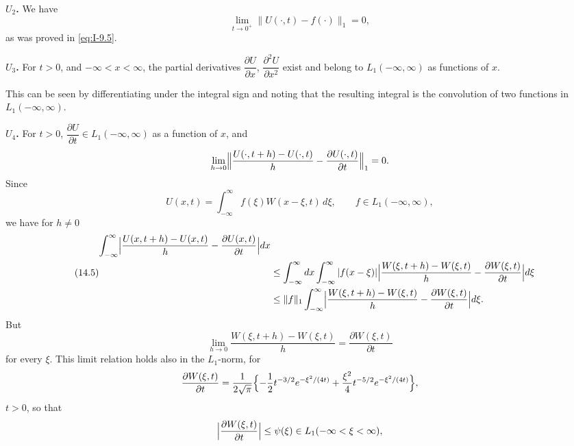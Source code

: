 \noindent\textbf{$U_2$.} We have
\begin{equation*}
\lim_{t\to 0^+}\|U(\cdot,t)-f(\cdot)\|_1=0,
\end{equation*}
as was proved in \eqref{eq:I-9.5}.

\noindent\textbf{$U_3$.} For $t>0$, and $-\infty<x<\infty$, the partial derivatives $\dfrac{\partial U}{\partial x}$, $\dfrac{\partial^{2}U}{\partial x^{2}}$ exist and belong to $L_1(-\infty,\infty)$ as functions of $x$.

This can be seen by differentiating under the integral sign and noting that the resulting integral is the convolution of two functions in $L_1(-\infty,\infty)$.

\noindent\textbf{$U_4$.} For $t>0$, $\dfrac{\partial U}{\partial t}\in L_1(-\infty,\infty)$ as a function of $x$, and
\begin{equation*}
\lim_{h\to 0}\Bigl\|\frac{U(\cdot,t+h)-U(\cdot,t)}{h}-\frac{\partial U(\cdot,t)}{\partial t}\Bigr\|_1=0.
\end{equation*}
Since
\begin{equation*}
U(x,t)=\int_{-\infty}^{\infty}f(\xi)W(x-\xi,t)\,d\xi,\qquad f\in L_1(-\infty,\infty),
\end{equation*}
we have for $h\neq 0$
\begin{equation}\label{eq:I-14.5}\tag{14.5}
\begin{aligned}
\int_{-\infty}^{\infty}\Bigl|\frac{U(x,t+h)-U(x,t)}{h}-\frac{\partial U(x,t)}{\partial t}\Bigr|dx\\
&\le\int_{-\infty}^{\infty}dx\int_{-\infty}^{\infty}|f(x-\xi)|\Bigl|\frac{W(\xi,t+h)-W(\xi,t)}{h}-\frac{\partial W(\xi,t)}{\partial t}\Bigr|d\xi\\
&\le\|f\|_1\int_{-\infty}^{\infty}\Bigl|\frac{W(\xi,t+h)-W(\xi,t)}{h}-\frac{\partial W(\xi,t)}{\partial t}\Bigr|d\xi.
\end{aligned}
\end{equation}
But
\begin{equation*}
\lim_{h\to 0}\frac{W(\xi,t+h)-W(\xi,t)}{h}=\frac{\partial W(\xi,t)}{\partial t}
\end{equation*}
for every $\xi$. This limit relation holds also in the $L_1$-norm, for
\begin{equation*}
\frac{\partial W(\xi,t)}{\partial t}
=\frac{1}{2\sqrt{\pi}}\Bigl\{-\frac12t^{-3/2}e^{-\xi^{2}/(4t)}+\frac{\xi^{2}}{4}t^{-5/2}e^{-\xi^{2}/(4t)}\Bigr\},
\end{equation*}
$t>0$, so that
\begin{equation*}
\Bigl|\frac{\partial W(\xi,t)}{\partial t}\Bigr|\le\psi(\xi)\in L_1(-\infty<\xi<\infty),
\end{equation*}
